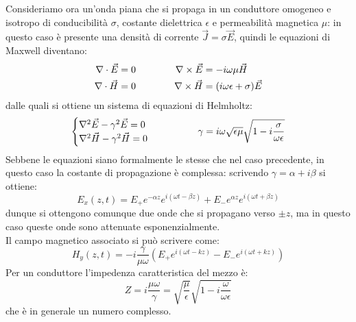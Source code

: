 \documentclass[]{article}
\begin{document}
Consideriamo ora un'onda piana che si propaga in un conduttore omogeneo e isotropo di conducibilità $ \sigma $, costante dielettrica $ \epsilon $ e permeabilità magnetica $ \mu $: in questo caso è presente una densità di corrente $ \vec{J} = \sigma\vec{E} $, quindi le equazioni di Maxwell diventano:
\begin{equation}
	\begin{split}
		\nabla\cdot\vec{E} &= 0 \\ 
		\nabla\cdot\vec{H} &= 0 
	\end{split}
	\qquad\qquad
	\begin{split}
		\nabla\times\vec{E} &= - i\omega \mu \vec{H} \\ 
		\nabla\times\vec{H} &= (i\omega \epsilon + \sigma) \vec{E}
	\end{split}
	\label{eq:18}
\end{equation}
dalle quali si ottiene un sistema di equazioni di Helmholtz:
\begin{equation}
	\begin{cases}
		\nabla^2\vec{E} - \gamma^2 \vec{E} = 0 \\ 
		\nabla^2\vec{H} - \gamma^2 \vec{H} = 0 
	\end{cases}
	\qquad\qquad \gamma = i \omega \sqrt{\epsilon\mu} \sqrt{1 - i \frac{\sigma}{\omega\epsilon}}
	\label{eq:19}
\end{equation}
Sebbene le equazioni siano formalmente le stesse che nel caso precedente, in questo caso la costante di propagazione è complessa: scrivendo $ \gamma = \alpha + i\beta $ si ottiene:
\begin{equation}
	E_x (z,t) = E_+ e^{-\alpha z} e^{i(\omega t - \beta z)} + E_- e^{\alpha z} e^{i(\omega t + \beta z)}
	\label{eq:20}
\end{equation}
dunque si ottengono comunque due onde che si propagano verso $ \pm z $, ma in questo caso queste onde sono attenuate esponenzialmente. \\ 
%
Il campo magnetico associato si può scrivere come:
\begin{equation}
	H_y (z,t) = -i\frac{\gamma}{\mu \omega} \left(E_+ e^{i(\omega t - kz)} - E_- e^{i(\omega t + kz)}\right)
	\label{eq:21}
\end{equation}
%
Per un conduttore l'impedenza caratteristica del mezzo è:
\begin{equation}
	Z = i \frac{\mu \omega}{\gamma} = \sqrt{\frac{\mu}{\epsilon}} \sqrt{1 - i \frac{\omega}{\omega \epsilon}}
	\label{eq:22}
\end{equation}
che è in generale un numero complesso. \\ 
\end{document}

